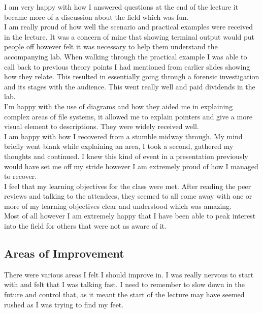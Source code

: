 \documentclass[a4paper,11pt]{article}
\begin{document}
I am very happy with how I answered questions at the end of the lecture it became more of a discussion about the field which was fun. \\

I am really proud of how well the scenario and practical examples were received in the lecture. It was a concern of mine that showing terminal output would put people off however felt it was necessary to help them understand the accompanying lab. When walking through the practical example I was able to call back to previous theory points I had mentioned from earlier slides showing how they relate. This resulted in essentially going through a forensic investigation and its stages with the audience. This went really well and paid dividends in the lab.\\

I'm happy with the use of diagrams and how they aided me in explaining complex areas of file systems, it allowed me to explain pointers and give a more visual element to descriptions. They were widely received well.\\

I am happy with how I recovered from a stumble midway through. My mind briefly went blank while explaining an area, I took a second,  gathered my thoughts and continued. I knew this kind of event in a presentation previously would have set me off my stride however I am extremely proud of how I managed to recover.\\

I feel that my learning objectives for the class were met. After reading the peer reviews and talking to the attendees, they seemed to all come away with one or more of my learning objectives clear and understood which was amazing.\\

Most of all however I am extremely happy that I have been able to peak interest into the field for others that were not as aware of it.

\subsection{Areas of Improvement}
There were various areas I felt I should improve in. I was really nervous to start with and felt that I was talking fast. I need to remember to slow down in the future and control that, as it meant the start of the lecture may have seemed rushed as I was trying to find my feet.\\
\end{document}
